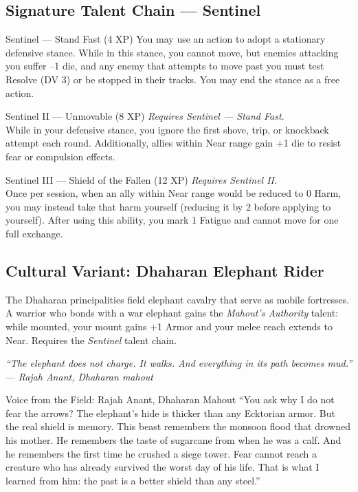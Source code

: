 \documentclass[9pt,a5paper]{extbook}
\begin{document}
\subsection{Signature Talent Chain --- Sentinel}

\begin{talentbox}{Sentinel --- Stand Fast (4 XP)}
You may use an action to adopt a stationary defensive stance. While in this stance, you cannot move, but enemies attacking you suffer --1 die, and any enemy that attempts to move past you must test Resolve (DV 3) or be stopped in their tracks. You may end the stance as a free action.
\end{talentbox}

\begin{talentbox}{Sentinel II --- Unmovable (8 XP)}
\textit{Requires Sentinel --- Stand Fast.} \\
While in your defensive stance, you ignore the first shove, trip, or knockback attempt each round. Additionally, allies within Near range gain +1 die to resist fear or compulsion effects.
\end{talentbox}

\begin{talentbox}{Sentinel III --- Shield of the Fallen (12 XP)}
\textit{Requires Sentinel II.} \\
Once per session, when an ally within Near range would be reduced to 0 Harm, you may instead take that harm yourself (reducing it by 2 before applying to yourself). After using this ability, you mark 1 Fatigue and cannot move for one full exchange.
\end{talentbox}

\subsection{Cultural Variant: Dhaharan Elephant Rider}
\label{culture:dhahara}
The Dhaharan principalities field elephant cavalry that serve as mobile fortresses. A warrior who bonds with a war elephant gains the \textit{Mahout's Authority} talent: while mounted, your mount gains +1 Armor and your melee reach extends to Near. Requires the \textit{Sentinel} talent chain.

\vspace{0.2cm}
\noindent\textit{``The elephant does not charge. It walks. And everything in its path becomes mud.''}  
\hfill --- \textit{Rajah Anant, Dhaharan mahout}

\begin{warriorbox}{Voice from the Field: Rajah Anant, Dhaharan Mahout}
``You ask why I do not fear the arrows? The elephant's hide is thicker than any Ecktorian armor. But the real shield is memory. This beast remembers the monsoon flood that drowned his mother. He remembers the taste of sugarcane from when he was a calf. And he remembers the first time he crushed a siege tower. Fear cannot reach a creature who has already survived the worst day of his life. That is what I learned from him: the past is a better shield than any steel.''
\end{warriorbox}
\end{document}
